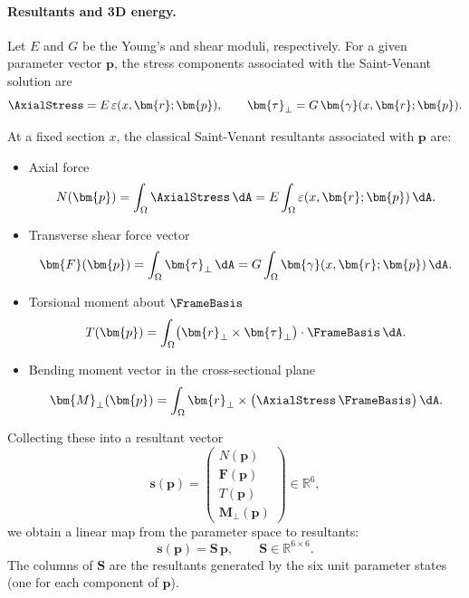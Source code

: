 \paragraph{Resultants and 3D energy.}

Let $E$ and $G$ be the Young's and shear moduli, respectively. For a given
parameter vector $\bm{p}$, the stress components associated with the
Saint-Venant solution are
\[
\AxialStress = E\,\varepsilon(x,\bm{r};\bm{p}),
\qquad
\bm{\tau}_\perp = G\,\bm{\gamma}(x,\bm{r};\bm{p}).
\]

At a fixed section $x$, the classical Saint-Venant resultants associated with
$\bm{p}$ are:
\begin{itemize}
\item Axial force
\[
N(\bm{p})
=
\int_\Omega \AxialStress\,\dA
=
E\int_\Omega \varepsilon(x,\bm{r};\bm{p})\,\dA.
\]
\item Transverse shear force vector
\[
\bm{F}(\bm{p})
=
\int_\Omega \bm{\tau}_\perp\,\dA
=
G\int_\Omega \bm{\gamma}(x,\bm{r};\bm{p})\,\dA.
\]
\item Torsional moment about $\FrameBasis$
\[
T(\bm{p})
=
\int_\Omega \bigl(\bm{r}_\perp \times \bm{\tau}_\perp\bigr)\cdot\FrameBasis
\,\dA.
\]
\item Bending moment vector in the cross-sectional plane
\[
\bm{M}_\perp(\bm{p})
=
\int_\Omega \bm{r}_\perp \times 
\bigl(\AxialStress\,\FrameBasis\bigr)\,\dA.
\]
\end{itemize}
Collecting these into a resultant vector
\[
\bm{s}(\bm{p})
=
\begin{pmatrix}
N(\bm{p}) \\[2pt]
\bm{F}(\bm{p}) \\[2pt]
T(\bm{p}) \\[2pt]
\bm{M}_\perp(\bm{p})
\end{pmatrix}
\in \mathbb{R}^6,
\]
we obtain a linear map from the parameter space to resultants:
\begin{equation}
\bm{s}(\bm{p})
=
\mathbf{S}\,\bm{p},
\qquad
\mathbf{S} \in \mathbb{R}^{6\times 6}.
\label{eq:def-S-matrix}
\end{equation}
The columns of $\mathbf{S}$ are the resultants generated by the six unit
parameter states (one for each component of $\bm{p}$).

